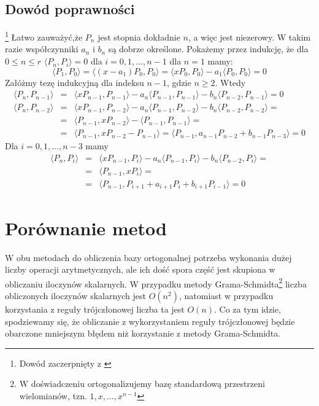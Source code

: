 \documentclass[12pt,wide]{mwart}
\begin{document}
\subsection{Dowód poprawności}\footnote{Dowód zaczerpnięty z \cite[strona 365]{Kin}} 
Łatwo zauważyć,że $P_n$ jest stopnia dokładnie $n$, a więc jest niezerowy. W takim razie współczynniki $a_n$ i $b_n$ są dobrze określone. Pokażemy przez indukcję, że dla $0 \leq n \leq r$ $\langle P_n,P_i \rangle = 0$ dla $i = 0,1,\ldots,n-1$ dla $n=1$ mamy:
$$
 \langle P_1,P_0 \rangle = \langle (x-a_1)P_0,P_0 \rangle = \langle xP_0,P_0 \rangle - a_1\langle P_0,P_0 \rangle = 0 
$$
Załóżmy tezę indukcyjną dla indeksu $n-1$, gdzie $n \geq 2$. Wtedy
\begin{eqnarray*}
\langle P_n,P_{n-1} \rangle &=& \langle xP_{n-1},P_{n-1} \rangle - a_n\langle P_{n-1},P_{n-1} \rangle - b_n\langle P_{n-2},P_{n-1} \rangle = 0\\
\langle P_n,P_{n-2} \rangle &=& \langle xP_{n-1},P_{n-2} \rangle - a_n\langle P_{n-1},P_{n-2} \rangle - b_n\langle P_{n-2},P_{n-2} \rangle=\\&=& \langle P_{n-1},xP_{n-2} \rangle - \langle P_{n-1},P_{n-1} \rangle= \\
&=& \langle P_{n-1},xP_{n-2} - P_{n-1} \rangle = \langle P_{n-1},a_{n-1}P_{n-2} + b_{n-1}P_{n-3} \rangle = 0
\end{eqnarray*}
Dla $i = 0,1,\ldots,n-3$ mamy
\begin{eqnarray*}
\langle P_n,P_i \rangle &=& \langle xP_{n-1},P_i \rangle - a_n\langle P_{n-1},P_i \rangle - b_n\langle P_{n-2},P_i \rangle =\\ &=& \langle P_{n-1},xP_i \rangle = \\ &=& \langle P_{n-1},P_{i+1} + a_{i+1}P_i + b_{i+1}P_{i-1} \rangle = 0 
\end{eqnarray*}


\section{Porównanie metod}
W obu metodach do obliczenia bazy ortogonalnej potrzeba wykonania dużej liczby operacji arytmetycznych, ale ich dość spora część jest skupiona w obliczaniu iloczynów skalarnych. W przypadku metody Grama-Schmidta\footnote{W doświadczeniu ortogonalizujemy bazę standardową przestrzeni wielomianów, tzn. $1,x,\ldots,x^{n-1}$} liczba obliczonych iloczynów skalarnych jest $O(n^2)$, natomiast w przypadku korzystania z reguły trójczłonowej liczba ta jest $O(n)$. Co za tym idzie, spodziewamy się, że obliczanie z wykorzystaniem reguły trójczłonowej będzie obarczone mniejszym błędem niż korzystanie z metody Grama-Schmidta.\\
\end{document}
